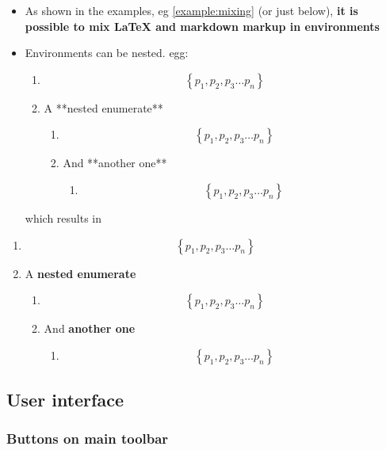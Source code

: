     \begin{itemize}
\item
  As shown in the examples, eg \ref{example:mixing} (or just below),
  \textbf{it is possible to mix LaTeX and markdown markup in
  environments}
\item
  Environments can be nested. egg:

  \begin{listing}
  \begin{enumerate}
  \item $$ \left\{ p_1, p_2, p_3 \ldots p_n \right\} $$
  \item A **nested enumerate**
  \begin{enumerate}
  \item $$ \left\{ p_1, p_2, p_3 \ldots p_n \right\} $$
  \item And **another one**
  \begin{enumerate}
  \item $$ \left\{ p_1, p_2, p_3 \ldots p_n \right\} $$
  \end{enumerate}
  \end{enumerate}
  \end{enumerate}
  \end{listing}

  which results in
\end{itemize}

    \begin{enumerate} \item
\[ \left\{ p_1, p_2, p_3 \ldots p_n \right\} \] \item A \textbf{nested
enumerate} \begin{enumerate} \item
\[ \left\{ p_1, p_2, p_3 \ldots p_n \right\} \] \item And
\textbf{another one} \begin{enumerate} \item
\[ \left\{ p_1, p_2, p_3 \ldots p_n \right\} \] \end{enumerate}
\end{enumerate} \end{enumerate}

    \subsection{User interface}\label{user-interface}

    \subsubsection{Buttons on main toolbar}\label{buttons-on-main-toolbar}

